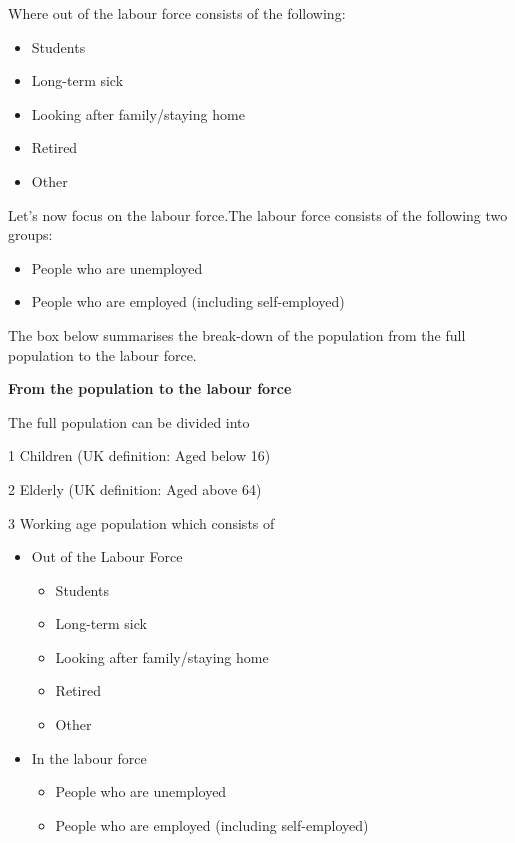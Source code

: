 \documentclass[
]{book}
\providecommand{\tightlist}{%
  \setlength{\itemsep}{0pt}\setlength{\parskip}{0pt}}
\begin{document}
Where out of the labour force consists of the following:

\begin{itemize}
\tightlist
\item
  Students
\item
  Long-term sick
\item
  Looking after family/staying home
\item
  Retired
\item
  Other
\end{itemize}

Let's now focus on the labour force.The labour force consists of the following two groups:

\begin{itemize}
\tightlist
\item
  People who are unemployed
\item
  People who are employed (including self-employed)
\end{itemize}

The box below summarises the break-down of the population from the full population to the labour force.

\begin{myblock}
\textbf{From the population to the labour force}

The full population can be divided into

1 Children (UK definition: Aged below 16)

2 Elderly (UK definition: Aged above 64)

3 Working age population which consists of

\begin{itemize}
\item
  Out of the Labour Force

  \begin{itemize}
  \tightlist
  \item
    Students
  \item
    Long-term sick
  \item
    Looking after family/staying home
  \item
    Retired
  \item
    Other
  \end{itemize}
\item
  In the labour force

  \begin{itemize}
  \tightlist
  \item
    People who are unemployed
  \item
    People who are employed (including self-employed)
  \end{itemize}
\end{itemize}
\end{myblock}
\end{document}
